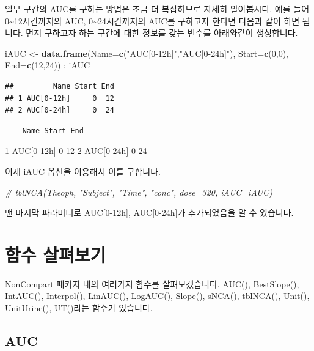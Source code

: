 \documentclass[12pt,]{krantz}
\newenvironment{Shaded}{\begin{snugshade}}{\end{snugshade}}
\newcommand{\KeywordTok}[1]{\textcolor[rgb]{0.13,0.29,0.53}{\textbf{#1}}}
\newcommand{\DataTypeTok}[1]{\textcolor[rgb]{0.13,0.29,0.53}{#1}}
\newcommand{\DecValTok}[1]{\textcolor[rgb]{0.00,0.00,0.81}{#1}}
\newcommand{\StringTok}[1]{\textcolor[rgb]{0.31,0.60,0.02}{#1}}
\newcommand{\CommentTok}[1]{\textcolor[rgb]{0.56,0.35,0.01}{\textit{#1}}}
\newcommand{\NormalTok}[1]{#1}
\theoremstyle{definition}
\theoremstyle{definition}
\theoremstyle{definition}
\theoremstyle{remark}
\begin{document}
일부 구간의 AUC를 구하는 방법은 조금 더 복잡하므로 자세히 알아봅시다.
예를 들어 0\textasciitilde{}12시간까지의 AUC,
0\textasciitilde{}24시간까지의 AUC를 구하고자 한다면 다음과 같이 하면
됩니다. 먼저 구하고자 하는 구간에 대한 정보를 갖는 변수를 아래와같이
생성합니다.

\begin{Shaded}
\begin{Highlighting}[]
\NormalTok{iAUC <-}\StringTok{ }\KeywordTok{data.frame}\NormalTok{(}\DataTypeTok{Name=}\KeywordTok{c}\NormalTok{(}\StringTok{"AUC[0-12h]"}\NormalTok{,}\StringTok{"AUC[0-24h]"}\NormalTok{), }\DataTypeTok{Start=}\KeywordTok{c}\NormalTok{(}\DecValTok{0}\NormalTok{,}\DecValTok{0}\NormalTok{), }\DataTypeTok{End=}\KeywordTok{c}\NormalTok{(}\DecValTok{12}\NormalTok{,}\DecValTok{24}\NormalTok{)) ; iAUC}
\end{Highlighting}
\end{Shaded}

\begin{verbatim}
##         Name Start End
## 1 AUC[0-12h]     0  12
## 2 AUC[0-24h]     0  24
\end{verbatim}

\begin{verbatim}
    Name Start End
\end{verbatim}

1 AUC{[}0-12h{]} 0 12 2 AUC{[}0-24h{]} 0 24

이제 iAUC 옵션을 이용해서 이를 구합니다.

\begin{Shaded}
\begin{Highlighting}[]
\CommentTok{# tblNCA(Theoph, "Subject", "Time", "conc", dose=320, iAUC=iAUC)}
\end{Highlighting}
\end{Shaded}

맨 마지막 파라미터로 AUC{[}0-12h{]}, AUC{[}0-24h{]}가 추가되었음을 알 수
있습니다.

\section{함수 살펴보기}\label{functions}

NonCompart 패키지 내의 여러가지 함수를 살펴보겠습니다. AUC(),
BestSlope(), IntAUC(), Interpol(), LinAUC(), LogAUC(), Slope(), sNCA(),
tblNCA(), Unit(), UnitUrine(), UT()라는 함수가 있습니다.

\subsection{AUC}\label{auc}
\end{document}

